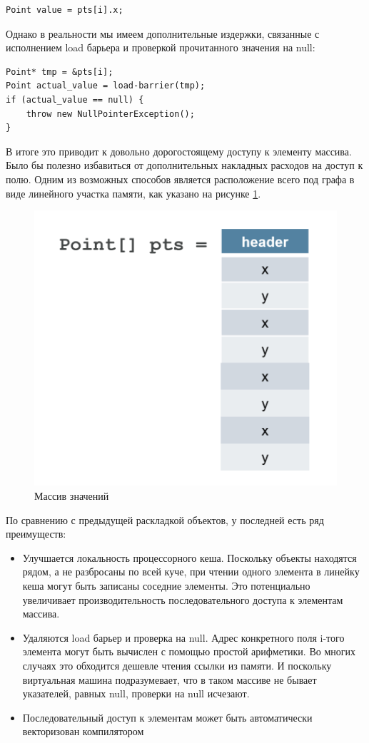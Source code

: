 \begin{lstlisting}
Point value = pts[i].x;
\end{lstlisting}
Однако в реальности мы имеем дополнительные издержки, связанные с исполнением load барьера и проверкой прочитанного значения на null:
\begin{lstlisting}
Point* tmp = &pts[i];
Point actual_value = load-barrier(tmp);
if (actual_value == null) {
	throw new NullPointerException();
}
\end{lstlisting}
В итоге это приводит к довольно дорогостоящему доступу к элементу массива. Было бы полезно избавиться от дополнительных накладных расходов на доступ к полю. Одним из возможных способов является расположение всего под графа в виде линейного участка памяти, как указано на рисунке \ref{values-graph}.

\begin{figure}[h]
	\caption{Массив значений}\label{values-graph}
	\includegraphics[width=0.65\linewidth]{image/flattened-points.png}
\end{figure}
По сравнению с предыдущей раскладкой объектов, у последней есть ряд преимуществ:
\begin{itemize}
	\item Улучшается локальность процессорного кеша. Поскольку объекты находятся рядом, а не разбросаны по всей куче, при чтении одного элемента в линейку кеша могут быть записаны соседние элементы. Это потенциально увеличивает производительность последовательного доступа к элементам массива.
	\item Удаляются load барьер и проверка на null. Адрес конкретного поля i-того элемента могут быть вычислен с помощью простой арифметики. Во многих случаях это обходится дешевле чтения ссылки из памяти. И поскольку виртуальная машина подразумевает, что в таком массиве не бывает указателей, равных null, проверки на null исчезают.
	\item Последовательный доступ к элементам может быть автоматически векторизован компилятором
\end{itemize}
